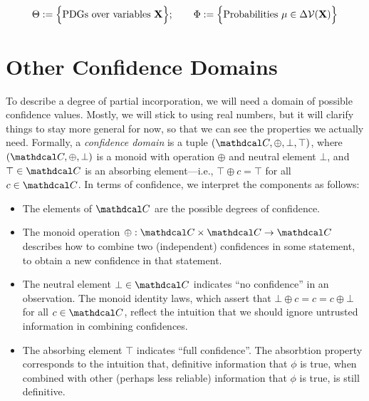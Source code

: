 \documentclass{article}
\def\confdom{\mathdcal C}
\begin{document}
\subsubsection{}
\begin{align*}
	\Theta :=
		\Big\{
		\text{PDGs over variables } \mathbf{X}
		\Big\}; \qquad
	\Phi := \Big\{
		\text{Probabilities}~ \mu \in \Delta \mathcal V(\mathbf{X})
		\Big\}
\end{align*}


\section{Other Confidence Domains}

To describe a degree of partial incorporation, we will need a domain of possible confidence values.
Mostly, we will stick to using real numbers, but it will clarify things to stay more general for now, so that we can see the properties we actually need. 
Formally, a \emph{confidence domain} is a tuple $(\confdom, \oplus, \bot, \top)$, 
where $(\confdom, \oplus, \bot)$ is a monoid with operation $\oplus$ and neutral element $\bot$, and $\top \in \confdom$ is an absorbing element---i.e., $\top \oplus c = \top$ for all $c \in \confdom$.
In terms of confidence, we interpret the components as follows:

\begin{itemize}%
	\item
	The elements of $\confdom$ are the possible degrees of confidence.

	\item
	The monoid operation $\oplus : \confdom \times \confdom \to \confdom$ describes how to combine two (independent) confidences in some statement, to obtain a new confidence in that statement.     

	\item The neutral element $\bot \in \confdom$ indicates ``no confidence'' in an observation.
	The monoid identity laws, which assert that
		$\bot \oplus c = c = c \oplus \bot$ for all $c \in \confdom$,
	reflect the intuition that we should ignore untrusted information in combining confidences.
	\item The absorbing element $\top$ indicates ``full confidence''.
	The absorbtion property corresponds to the intuition that, definitive information that $\phi$ is true, when combined with other (perhaps less reliable) information that $\phi$ is true, is still definitive.
\end{itemize}
\end{document}
